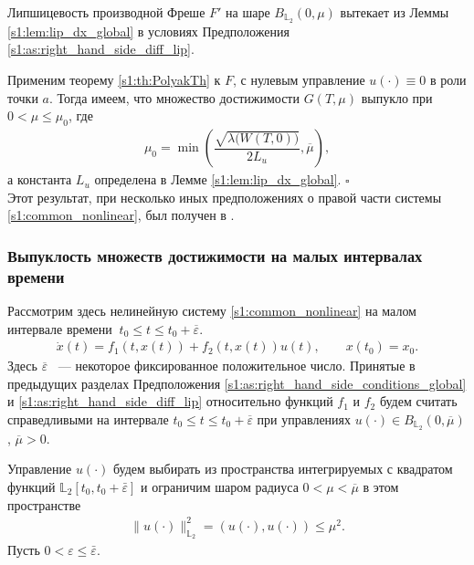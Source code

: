 \documentclass[../main.tex]{subfiles}
\begin{document}
Липшицевость производной Фреше $F'$ на шаре $B_{\mathbb{L}_2}(0,\mu)$ вытекает из Леммы \ref{s1:lem:lip_dx_global} в условиях Предположения \ref{s1:as:right_hand_side_diff_lip}. 
    
Применим теорему \ref{s1:th:PolyakTh} к $F$, с нулевым управление $u(\cdot) \equiv 0$ в роли точки $a$. 
Тогда имеем, что множество достижимости $G(T,\mu)$ выпукло при $ 0 < \mu \leqslant \mu_0 $, где  
\begin{gather}\label{s1:mu0}
    \mu_0 = \min\left( \dfrac{\sqrt{\lambda\big(W(T,0)\big)}}{2L_u}, \overline{\mu} \right), 
\end{gather}
а константа $L_u $ определена в Лемме  \ref{s1:lem:lip_dx_global}. 
\hfill$\square$\\[1ex]%
Этот результат, при несколько иных предположениях о правой части системы \eqref{s1:common_nonlinear}, был получен в \cite{Polyak2004}.
    
\subsubsection{Выпуклость множеств достижимости на малых интервалах времени}
Рассмотрим здесь нелинейную систему \eqref{s1:common_nonlinear} на малом интервале времени $\ t_0 \leqslant t \leqslant t_0 + \overline{\varepsilon} $.
\begin{gather}\label{s1:common_nonlinear_small_time}
    \dot{x}(t)=f_1(t,x(t))+f_2(t,x(t))u(t), \qquad x(t_0) = x_0.
\end{gather}
Здесь $ \overline{\varepsilon} $ ~--- некоторое фиксированное положительное число.
Принятые в предыдущих разделах Предположения \ref{s1:as:right_hand_side_conditions_global} и \ref{s1:as:right_hand_side_diff_lip} относительно функций $f_1$ и $f_2$ будем считать справедливыми на интервале $t_0 \leqslant t \leqslant t_0 + \overline{\varepsilon} $ при управлениях $u(\cdot) \in B_{\mathbb{L}_2}(0, \overline{\mu}) $, $\overline{\mu} > 0$.
   

Управление $u(\cdot)$ будем выбирать из пространства интегрируемых с квадратом функций $\mathbb{L}_2[t_0,t_0+\bar{\varepsilon}]$ и ограничим шаром радиуса $  0 < \mu < \overline{\mu} $ в этом пространстве
\begin{gather*}
    \lVert u(\cdot)\rVert^2_{\mathbb{L}_2} = \left(u(\cdot),u(\cdot) \right) \leqslant \mu^2.
\end{gather*}
Пусть $ 0 <  \varepsilon \leqslant \bar{\varepsilon} $.
 
\end{document}
